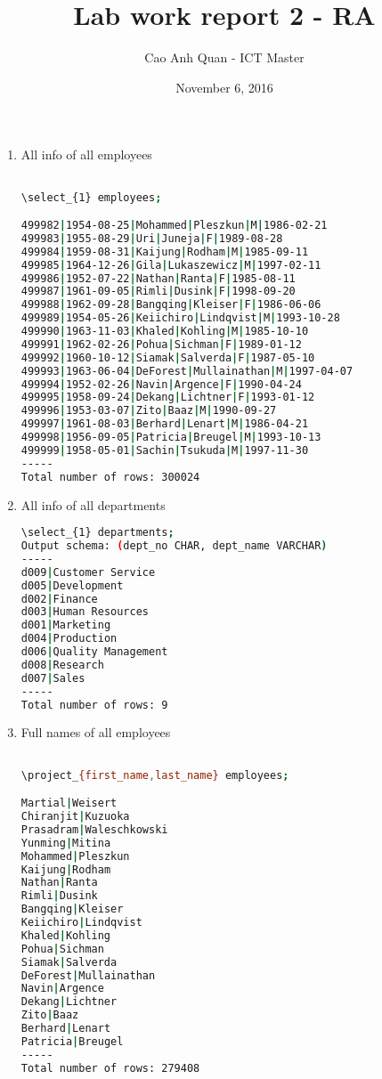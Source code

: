 \documentclass[12pt, letterpaper, twoside]{article}
\title{Lab work report 2 - RA}
\author{Cao Anh Quan - ICT Master}
\date{November 6, 2016}
\begin{document}
 
\begin{titlepage}
\maketitle
\end{titlepage}

\begin{enumerate}

\item All info of all employees
\begin{lstlisting}[language=Bash]

\select_{1} employees;

499982|1954-08-25|Mohammed|Pleszkun|M|1986-02-21
499983|1955-08-29|Uri|Juneja|F|1989-08-28
499984|1959-08-31|Kaijung|Rodham|M|1985-09-11
499985|1964-12-26|Gila|Lukaszewicz|M|1997-02-11
499986|1952-07-22|Nathan|Ranta|F|1985-08-11
499987|1961-09-05|Rimli|Dusink|F|1998-09-20
499988|1962-09-28|Bangqing|Kleiser|F|1986-06-06
499989|1954-05-26|Keiichiro|Lindqvist|M|1993-10-28
499990|1963-11-03|Khaled|Kohling|M|1985-10-10
499991|1962-02-26|Pohua|Sichman|F|1989-01-12
499992|1960-10-12|Siamak|Salverda|F|1987-05-10
499993|1963-06-04|DeForest|Mullainathan|M|1997-04-07
499994|1952-02-26|Navin|Argence|F|1990-04-24
499995|1958-09-24|Dekang|Lichtner|F|1993-01-12
499996|1953-03-07|Zito|Baaz|M|1990-09-27
499997|1961-08-03|Berhard|Lenart|M|1986-04-21
499998|1956-09-05|Patricia|Breugel|M|1993-10-13
499999|1958-05-01|Sachin|Tsukuda|M|1997-11-30
-----
Total number of rows: 300024

\end{lstlisting}


\item All info of all departments
\begin{lstlisting}[language=Bash]
\select_{1} departments;
Output schema: (dept_no CHAR, dept_name VARCHAR)
-----
d009|Customer Service
d005|Development
d002|Finance
d003|Human Resources
d001|Marketing
d004|Production
d006|Quality Management
d008|Research
d007|Sales
-----
Total number of rows: 9
\end{lstlisting}


\item Full names of all employees
\begin{lstlisting}[language=Bash]

\project_{first_name,last_name} employees;

Martial|Weisert
Chiranjit|Kuzuoka
Prasadram|Waleschkowski
Yunming|Mitina
Mohammed|Pleszkun
Kaijung|Rodham
Nathan|Ranta
Rimli|Dusink
Bangqing|Kleiser
Keiichiro|Lindqvist
Khaled|Kohling
Pohua|Sichman
Siamak|Salverda
DeForest|Mullainathan
Navin|Argence
Dekang|Lichtner
Zito|Baaz
Berhard|Lenart
Patricia|Breugel
-----
Total number of rows: 279408


\end{lstlisting}
\end{enumerate}
\end{document}
